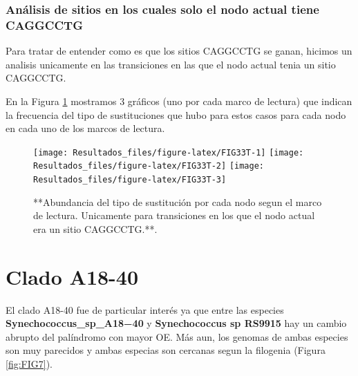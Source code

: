 \documentclass[
]{book}
\begin{document}
\hypertarget{anuxe1lisis-de-sitios-en-los-cuales-solo-el-nodo-actual-tiene-caggcctg}{%
\subsubsection{Análisis de sitios en los cuales solo el nodo actual tiene CAGGCCTG}\label{anuxe1lisis-de-sitios-en-los-cuales-solo-el-nodo-actual-tiene-caggcctg}}

Para tratar de entender como es que los sitios CAGGCCTG se ganan, hicimos un analisis unicamente en las transiciones en las que el nodo actual tenia un sitio CAGGCCTG.

En la Figura \ref{fig:FIG33T} mostramos 3 gráficos (uno por cada marco de lectura) que indican la frecuencia del tipo de sustituciones que hubo para estos casos para cada nodo en cada uno de los marcos de lectura.

\begin{figure}

{\centering \texttt{[image: Resultados\_files/figure-latex/FIG33T-1]} \texttt{[image: Resultados\_files/figure-latex/FIG33T-2]} \texttt{[image: Resultados\_files/figure-latex/FIG33T-3]} 

}

\caption{**Abundancia del tipo de sustitución por cada nodo segun el marco de lectura. Unicamente para transiciones en los que el nodo actual era un sitio CAGGCCTG.**.}\label{fig:FIG33T}
\end{figure}

\hypertarget{clado-a18-40}{%
\section{Clado A18-40}\label{clado-a18-40}}

El clado A18-40 fue de particular interés ya que entre las especies \textbf{Synechococcus\_sp\_A18−40} y \textbf{Synechococcus sp RS9915} hay un cambio abrupto del palíndromo con mayor OE. Más aun, los genomas de ambas especies son muy parecidos y ambas especias son cercanas segun la filogenia (Figura \ref{fig:FIG7}).
\end{document}
